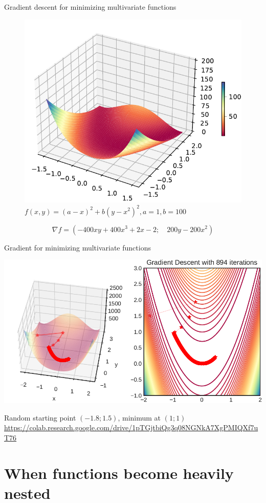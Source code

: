 \documentclass[12pt,aspectratio=169,handout]{beamer}
\begin{document}
\begin{frame}{Gradient descent for minimizing multivariate functions}
	
	\begin{figure}
		\centering
		\includegraphics[width=0.40\linewidth]{img/rosenbrock.pdf}
		\caption{$f(x,y)=(a-x)^{2}+b(y-x^{2})^{2}, a = 1, b = 100$}
	\end{figure}
	$$\nabla f = \left(-400xy+400x^3+2x-2; \quad 200y-200x^2 \right)$$
	
\end{frame}

\begin{frame}{Gradient for minimizing multivariate functions}
	
	\includegraphics[width=0.86\linewidth]{img/gradient1.pdf}
	
	Random starting point $(-1.8; 1.5)$, minimum at $(1; 1)$ \\

{\tiny \url{https://colab.research.google.com/drive/1pTGjtbiQg3q08NGNkA7XgPMIQXf7uT76}}

	
\end{frame}

\section{When functions become heavily nested}
\end{document}
